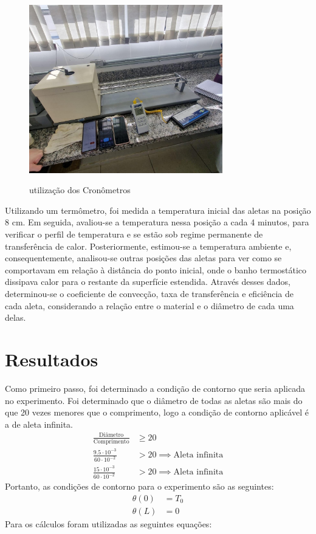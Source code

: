 \documentclass[12pt,openright,twoside,a4paper]{abntex2}
\begin{document}
\begin{figure}[H]
	\caption{utilização dos Cronômetros}
	\centering
	\includegraphics[width=0.75\textwidth]{figura5.jpg}
	\label{fig:Figura5}
\end{figure}

Utilizando um termômetro, foi medida a temperatura inicial das aletas na posição 8 cm. Em seguida, avaliou-se a temperatura nessa posição a cada 4 minutos, para verificar o perfil de temperatura e se estão sob regime permanente de transferência de calor. Posteriormente, estimou-se a temperatura ambiente e, consequentemente, analisou-se outras posições das aletas para ver como se comportavam em relação à distância do ponto inicial, onde o banho termostático dissipava calor para o restante da superfície estendida. Através desses dados, determinou-se o coeficiente de convecção, taxa de transferência e eficiência de cada aleta, considerando a relação entre o material e o diâmetro de cada uma delas.

\chapter{Resultados}\label{ch: Resultados}
Como primeiro passo, foi determinado a condição de contorno que seria aplicada no experimento. Foi determinado que o diâmetro de todas as aletas são mais do que 20 vezes menores que o comprimento, logo a condição de contorno aplicável é a de aleta infinita.
\begin{align}
	\label{eq:dem cond_contorno}
	\frac{\text{Diâmetro}}{\text{Comprimento}} & \geq 20                              \\
	\frac{9.5 \cdot 10^{-3}}{60 \cdot 10^{-2}} & > 20  \implies \text{Aleta infinita} \\
	\frac{15 \cdot 10^{-3}}{60 \cdot 10 ^{-2}} & > 20 \implies \text{Aleta infinita}
\end{align}
Portanto, as condições de contorno para o experimento são as seguintes:
\begin{align}
	\label{eq:cond_contorno}
	\theta(0) & = T_0 \\
	\theta(L) & = 0
\end{align}
Para os cálculos foram utilizadas as seguintes equações:
\end{document}
